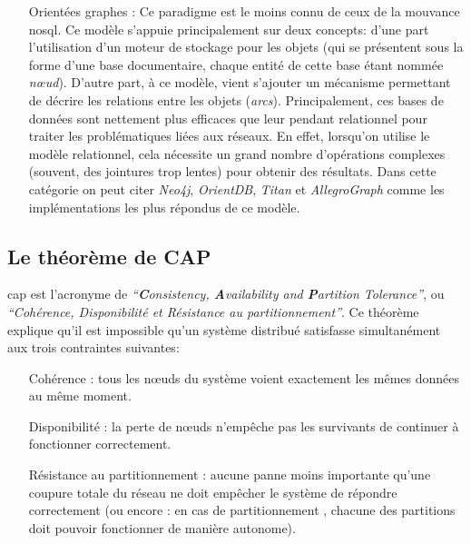 \begin{itemize}
  \item [Orientées graphes]: Ce paradigme est le moins connu de ceux
    de la mouvance \acrshort{nosql}. Ce modèle s'appuie principalement
    sur deux concepts: d'une part l'utilisation d'un moteur de
    stockage pour les objets (qui se présentent sous la forme d'une
    base documentaire, chaque entité de cette base étant nommée
    \emph{nœud}). D'autre part, à ce modèle, vient s'ajouter un
    mécanisme permettant de décrire les relations entre les objets
    (\emph{arcs}). Principalement, ces bases de données sont nettement
    plus efficaces que leur pendant relationnel pour traiter les
    problématiques liées aux réseaux.  En effet, lorsqu'on utilise le
    modèle relationnel, cela nécessite un grand nombre d'opérations
    complexes (souvent, des jointures trop lentes) pour obtenir des
    résultats. Dans cette catégorie on peut citer \emph{Neo4j},
    \emph{OrientDB}, \emph{Titan} et \emph{AllegroGraph} comme les
    implémentations les plus répondus de ce modèle.
  \end{itemize}

  \subsection{Le théorème de CAP }
  \label{sec:cap}

  \acrshort{cap} \cite{brewer2000towards} est l'acronyme de
  \textit{``\textbf{C}onsistency, \textbf{A}vailability and
    \textbf{P}artition Tolerance''}, ou \textit{``Cohérence,
    Disponibilité et Résistance au partitionnement''}. Ce théorème
  explique qu'il est impossible qu'un système distribué satisfasse
  simultanément aux trois contraintes suivantes:

  \begin{itemize}
  \item [Cohérence]: tous les nœuds du système voient exactement les
    mêmes données au même moment.

  \item [Disponibilité]: la perte de nœuds n'empêche pas les survivants
    de continuer à fonctionner correctement.

  \item [Résistance au partitionnement]: aucune panne moins importante
    qu'une coupure totale du réseau ne doit empêcher le système de
    répondre correctement (ou encore : en cas de partitionnement ,
    chacune des partitions doit pouvoir fonctionner de manière
    autonome).
  \end{itemize}

